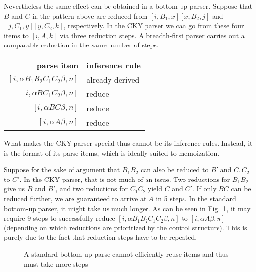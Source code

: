 Nevertheless the same effect can be obtained in a bottom-up parser.
Suppose that $B$ and $C$ in the pattern above are reduced from $[i,B_1,x] [x,B_2,j]$ and $[j,C_1,y] [y,C_2,k]$, respectively.
In the CKY parser we can go from these four items to $[i, A, k]$ via three reduction steps.
A breadth-first parser carries out a comparable reduction in the same number of steps.
%
\begin{center}
    \begin{tabular}{r|l}
        \textbf{parse item} & \textbf{inference rule}\\
        $[i,\alpha B_1 B_2 C_1 C_2 \beta, n]$ & already derived\\
        $[i,\alpha B C_1 C_2 \beta, n]$ & reduce\\
        $[i,\alpha B C \beta,n]$ & reduce\\
        $[i,\alpha A \beta,n]$ & reduce
    \end{tabular}
\end{center}
%
What makes the CKY parser special thus cannot be its inference rules.
Instead, it is the format of its parse items, which is ideally suited to memoization.

Suppose for the sake of argument that $B_1 B_2$ can also be reduced to $B'$ and $C_1 C_2$ to $C'$.
In the CKY parser, that is not much of an issue.
Two reductions for $B_1 B_2$ give us $B$ and $B'$, and two reductions for $C_1 C_2$ yield $C$ and $C'$.
If only $B C$ can be reduced further, we are guaranteed to arrive at $A$ in 5 steps.
In the standard bottom-up parser, it might take us much longer.
As can be seen in Fig.~\ref{fig:Chart_BottomUpExtraSteps}, it may require 9 steps to successfully reduce $[i,\alpha B_1 B_2 C_1 C_2 \beta, n]$ to $[i,\alpha A \beta, n]$ (depending on which reductions are prioritized by the control structure).
This is purely due to the fact that reduction steps have to be repeated.
%
\begin{figure}
    \centering
\caption{A standard bottom-up parse cannot efficiently reuse items and thus must take more steps}
\label{fig:Chart_BottomUpExtraSteps}
\end{figure}

